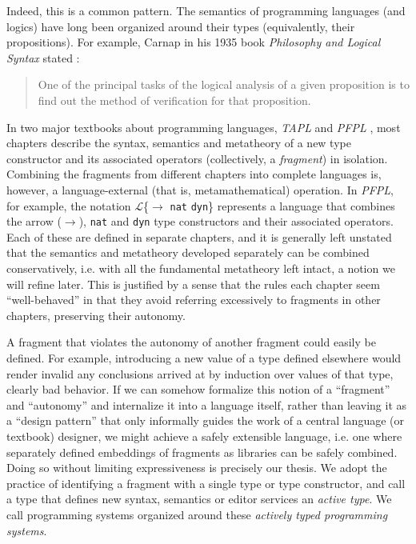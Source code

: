 Indeed, this is a common pattern. The semantics of programming languages (and logics) have long been organized around their types (equivalently, their propositions). %
For example, Carnap in his 1935 book \emph{Philosophy and Logical Syntax} stated \cite{carnap1935philosophy}:
\begin{quote}
One of the principal tasks of the logical analysis of a given proposition is to find out the method of verification for that proposition.
\end{quote}
In two major textbooks about programming languages, \emph{TAPL} \cite{tapl} and \emph{PFPL} \cite{pfpl}, most chapters describe the syntax, semantics and metatheory of a new type constructor and its associated  operators (collectively, a \emph{fragment}) in isolation. Combining the fragments from different chapters into complete languages is, however, a language-external (that is, metamathematical) operation. In \emph{PFPL}, for example,  the notation $\mathcal{L}$\{$\rightarrow$ \verb|nat| \verb|dyn|\} represents a language that combines the arrow ($\rightarrow$), \verb|nat| and \verb|dyn| type constructors and their associated operators. Each of these are defined in separate chapters, and it is generally left unstated that the semantics and metatheory developed separately can be combined conservatively, i.e. with all the fundamental metatheory left intact, a notion we will refine later. This is justified by a sense that the rules each chapter seem ``well-behaved'' in that they  avoid referring excessively to fragments in other chapters, preserving their autonomy.%

A fragment that violates the autonomy of another fragment could easily be defined. For example,  introducing a new value of a type defined elsewhere would render invalid any conclusions arrived at by induction over values of that type, clearly bad behavior. If we can somehow formalize this notion of a ``fragment'' and ``autonomy'' and internalize it into a language itself, rather than leaving it as a ``design pattern'' that only informally guides the work of a central language (or textbook) designer, we might achieve  a safely extensible language, i.e. one where separately defined embeddings of  fragments as libraries can be safely combined. Doing so without limiting expressiveness is precisely our thesis. We adopt the practice of identifying a fragment with a single type or type constructor, and call a type that defines new syntax, semantics or editor services an \emph{active type}. We call programming systems organized around these \emph{actively typed programming systems}.


